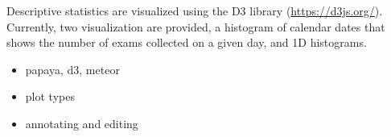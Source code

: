 Descriptive statistics are visualized using the D3 library (\href{https://d3js.org/}{https://d3js.org/}). Currently, two visualization are provided, a histogram of calendar dates that shows the number of exams collected on a given day, and 1D histograms. 

\begin{itemize}
\item papaya, d3, meteor
\item plot types
\item annotating and editing
\end{itemize}
